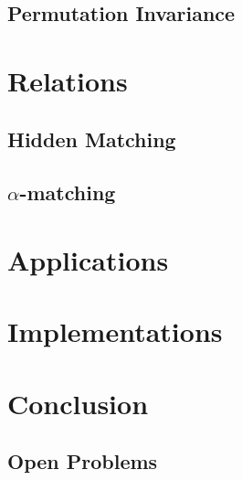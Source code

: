 \documentclass[a4paper]{article}
\begin{document}
        \subsection{Permutation Invariance}
        
    \section{Relations}
    
        \subsection{Hidden Matching}
        
        \subsection{$\alpha$-matching}
        
    \section{Applications}
    
    \section{Implementations}
    
    \section{Conclusion}
    
        \subsection{Open Problems}
\end{document}
